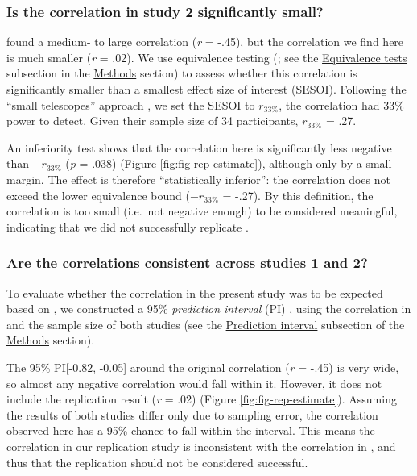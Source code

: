 \documentclass[11pt,english,]{memoir}
\begin{document}
\hypertarget{is-the-correlation-in-study-2-significantly-small}{%
\subsubsection{Is the correlation in study 2 significantly small?}\label{is-the-correlation-in-study-2-significantly-small}}

\textcite{London2015} found a medium- to large correlation (\emph{r} = -.45), but the correlation we find here is much smaller (\emph{r} = .02). We use equivalence testing (\textcite{Lakens2018}; see the \protect\hyperlink{eq}{Equivalence tests} subsection in the \protect\hyperlink{AB_tDCS-methods}{Methods} section) to assess whether this correlation is significantly smaller than a smallest effect size of interest (SESOI). Following the ``small telescopes'' approach \autocite{Simonsohn2015}, we set the SESOI to \(r_{33\%}\), the correlation \textcite{London2015} had 33\% power to detect. Given their sample size of 34 participants, \(r_{33\%}\) = .27.

An inferiority test shows that the correlation here is significantly less negative than \(-r_{33\%}\) (\emph{p} = .038) (Figure \ref{fig:fig-rep-estimate}), although only by a small margin. The effect is therefore ``statistically inferior'': the correlation does not exceed the lower equivalence bound (\(-r_{33\%}\) = -.27). By this definition, the correlation is too small (i.e.~not negative enough) to be considered meaningful, indicating that we did not successfully replicate \textcite{London2015}.

\hypertarget{are-the-correlations-consistent-across-studies-1-and-2}{%
\subsubsection{Are the correlations consistent across studies 1 and 2?}\label{are-the-correlations-consistent-across-studies-1-and-2}}

To evaluate whether the correlation in the present study was to be expected based on \textcite{London2015}, we constructed a 95\% \emph{prediction interval} (PI) \autocite{Spence2016}, using the correlation in \textcite{London2015} and the sample size of both studies (see the \protect\hyperlink{pi}{Prediction interval} subsection of the \protect\hyperlink{AB_tDCS-methods}{Methods} section).

The 95\% PI{[}-0.82, -0.05{]} around the original correlation (\emph{r} = -.45) is very wide, so almost any negative correlation would fall within it. However, it does not include the replication result (\emph{r} = .02) (Figure \ref{fig:fig-rep-estimate}). Assuming the results of both studies differ only due to sampling error, the correlation observed here has a 95\% chance to fall within the interval. This means the correlation in our replication study is inconsistent with the correlation in \textcite{London2015}, and thus that the replication should not be considered successful.
\end{document}
